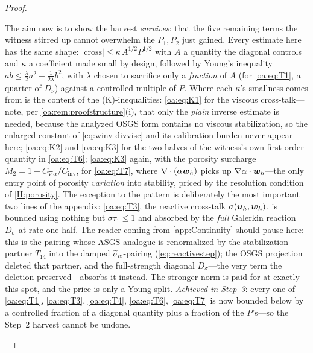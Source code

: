 \begin{proof}
\begin{pedagogy}
The aim now is to show the harvest \emph{survives}: that the five remaining terms
the witness stirred up cannot overwhelm the $P_1,P_2$ just gained. Every estimate
here has the same shape: $|\text{cross}| \le \kappa\,A^{1/2}
P^{1/2}$ with $A$ a quantity the diagonal controls and $\kappa$ a coefficient
made small by design, followed by Young's inequality $ab \le
\tfrac{\lambda}{2}a^2 + \tfrac{1}{2\lambda}b^2$, with $\lambda$ chosen to
sacrifice only a \emph{fraction} of $A$ (for \cref{oa:eq:T1}, a quarter of
$D_\nu$) against a controlled multiple of $P$. Where each $\kappa$'s smallness
comes from is the content of the (K)-inequalities: \cref{oa:eq:K1} for the
viscous cross-talk---note, per \cref{oa:rem:proofstructure}(i), that only the
\emph{plain} inverse estimate is needed, because the analyzed OSGS form
contains no viscous stabilization, so the enlarged constant of
\cref{eq:winv-divvisc} and its calibration burden never appear here;
\cref{oa:eq:K2} and \cref{oa:eq:K3} for the two halves of the witness's own
first-order quantity in \cref{oa:eq:T6}; \cref{oa:eq:K3} again, with the
porosity surcharge $M_2 = 1 + C_{\nabla\alpha}/C_{\mathrm{inv}}$, for
\cref{oa:eq:T7}, where $\nabla\cdot(\alpha\boldsymbol{w}_h)$ picks up
$\nabla\alpha\cdot\boldsymbol{w}_h$---the only entry point of porosity \emph{variation}
into stability, priced by the resolution condition of \cref{H:porosity}. The
exception to the pattern is deliberately the most important two lines of the
appendix: \cref{oa:eq:T3}, the reactive cross-talk $\sigma(\boldsymbol{u}_h,\boldsymbol{w}_h)$, is
bounded using nothing but $\sigma\tau_1 \le 1$ and absorbed by the \emph{full}
Galerkin reaction $D_\sigma$ at rate one half. The reader coming from
\cref{app:Continuity} should pause here: this is the pairing whose ASGS
analogue is renormalized by the stabilization partner $T_{14}$ into the damped
$\widetilde{\sigma}_{\alpha}$-pairing (\cref{eq:reactivestep}); the OSGS projection deleted
that partner, and the full-strength diagonal $D_\sigma$---the very term the
deletion preserved---absorbs it instead. The stronger norm is paid for at
exactly this spot, and the price is only a Young split.
\emph{Achieved in Step~3}: every one of \cref{oa:eq:T1}, \cref{oa:eq:T3},
\cref{oa:eq:T4}, \cref{oa:eq:T6}, \cref{oa:eq:T7} is now bounded below by a
controlled fraction of a diagonal quantity plus a fraction of the $P$'s---so the
Step~2 harvest cannot be undone.
\end{pedagogy}


\end{proof}
